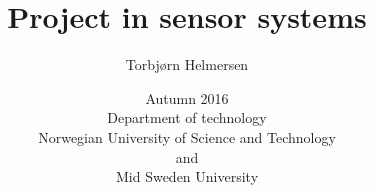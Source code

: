 \documentclass[12pt]{report}
\begin{document}
\title{Project in sensor systems}
\author{Torbjørn Helmersen}
\date{Autumn 2016\\ Department of technology \\ Norwegian University of Science and Technology\\and\\ Mid Sweden University}


\maketitle



\setcounter{page}{1}
\tableofcontents
{}











\begin{appendices}







    







\end{appendices}
\end{document}
